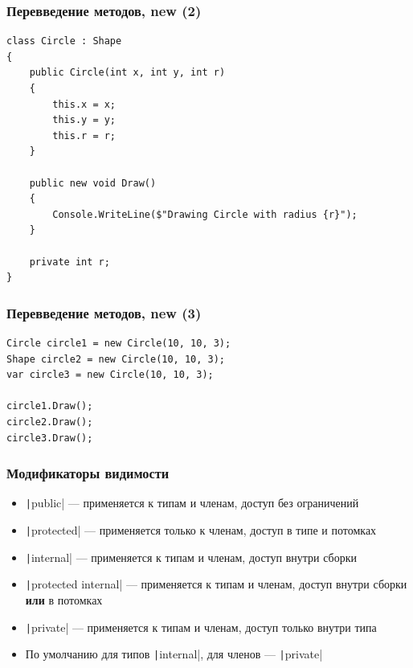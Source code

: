 \documentclass[xetex,mathserif,serif]{beamer}
\begin{document}
	\begin{frame}[fragile]
		\frametitle{Перевведение методов, new (2)}
		\begin{small}
			\begin{verbatim}
class Circle : Shape
{
    public Circle(int x, int y, int r)
    {
        this.x = x;
        this.y = y;
        this.r = r;
    }

    public new void Draw()
    {
        Console.WriteLine($"Drawing Circle with radius {r}");
    }

    private int r;
}
			\end{verbatim}
		\end{small}
	\end{frame}

	\begin{frame}[fragile]
		\frametitle{Перевведение методов, new (3)}
		\begin{verbatim}
Circle circle1 = new Circle(10, 10, 3);
Shape circle2 = new Circle(10, 10, 3);
var circle3 = new Circle(10, 10, 3);

circle1.Draw();
circle2.Draw();
circle3.Draw();
		\end{verbatim}
	\end{frame}

	\begin{frame}
		\frametitle{Модификаторы видимости}
		\begin{itemize}
			\item \texttt|public| --- применяется к типам и членам, доступ без ограничений
			\item \texttt|protected| --- применяется только к членам, доступ в типе и потомках
			\item \texttt|internal| --- применяется к типам и членам, доступ внутри сборки
			\item \texttt|protected internal| --- применяется к типам и членам, доступ внутри сборки \textbf{или} в потомках
			\item \texttt|private| --- применяется к типам и членам, доступ только внутри типа
			\item По умолчанию для типов \texttt|internal|, для членов --- \texttt|private|
		\end{itemize}
	\end{frame}
\end{document}
